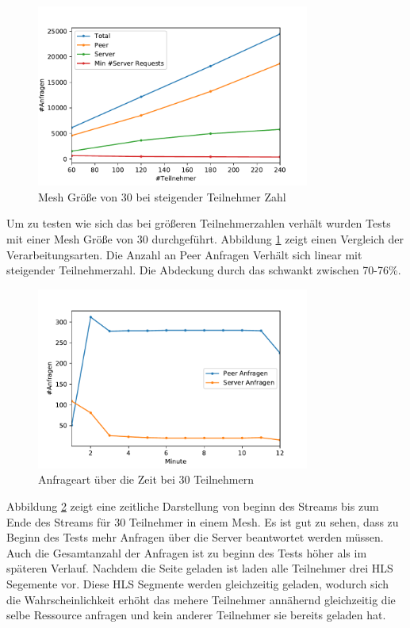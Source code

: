\begin{figure}[!h]
	\centering
	\includegraphics[width=0.8\textwidth]{figures/meshed_30_line}
	\caption[A Figure Short-Title]{Mesh Größe von 30 bei steigender Teilnehmer Zahl}
	\label{fig:meshed_30_line}
\end{figure}

Um zu testen wie sich das \cdn bei größeren Teilnehmerzahlen verhält wurden Tests mit einer Mesh Größe von 30 durchgeführt. Abbildung \ref{fig:meshed_30_line} zeigt einen Vergleich der Verarbeitungsarten. Die Anzahl an Peer Anfragen Verhält sich linear mit steigender Teilnehmerzahl. Die Abdeckung durch das \cdn schwankt zwischen 70-76\%.


\begin{figure}[!h]
	\centering
	\includegraphics[width=0.8\textwidth]{figures/peer_vs_server_over_time}
	\caption[A Figure Short-Title]{Anfrageart über die Zeit bei 30 Teilnehmern}
	\label{fig:peer_vs_server_over_time}
\end{figure}

Abbildung \ref{fig:peer_vs_server_over_time} zeigt eine zeitliche Darstellung von beginn des Streams bis zum Ende des Streams für 30 Teilnehmer in einem Mesh. Es ist gut zu sehen, dass zu Beginn des Tests mehr Anfragen über die Server beantwortet werden müssen. Auch die Gesamtanzahl der Anfragen ist zu beginn des Tests höher als im späteren Verlauf. Nachdem die Seite geladen ist laden alle Teilnehmer drei HLS Segemente vor. Diese HLS Segmente werden gleichzeitig geladen, wodurch sich die Wahrscheinlichkeit erhöht das mehere Teilnehmer annähernd gleichzeitig die selbe Ressource anfragen und kein anderer Teilnehmer sie bereits geladen hat. 



